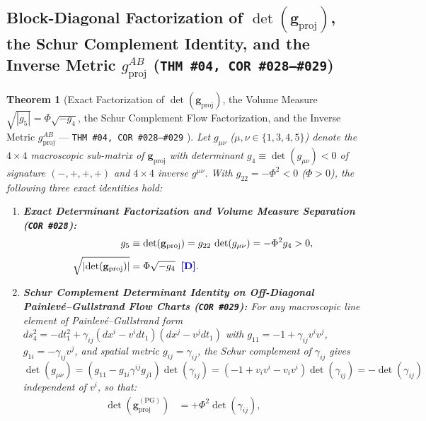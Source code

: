 \documentclass[11pt,a4paper]{article}
\newcommand{\catD}{\text{\textbf{\textcolor{blue!75!black}{[D]}}}}
\theoremstyle{definition}
\theoremstyle{plain}
\newtheorem{theorem}[axiom]{Theorem}
\theoremstyle{remark}
\begin{document}
\subsection{\texorpdfstring{Block-Diagonal Factorization of $\det(\mathbf{g}_{\mathrm{proj}})$, the Schur Complement Identity, and the Inverse Metric $g^{AB}_{\mathrm{proj}}$ (\texttt{THM~\#04, COR~\#028--\#029})}{Block-Diagonal Factorization of det(g\_proj), the Schur Complement Identity, and the Inverse Metric g\^AB\_proj}}

\begin{theorem}[Exact Factorization of $\det(\mathbf{g}_{\mathrm{proj}})$, the Volume Measure $\sqrt{|g_5|} = \Phi\sqrt{-g_4}$, the Schur Complement Flow Factorization, and the Inverse Metric $g^{AB}_{\mathrm{proj}}$ --- \texttt{THM~\#04, COR~\#028--\#029} \catD]\label{thm:c1_det_inverse_metric}\label{thm:c1_metric_factorization}
Let $g_{\mu\nu}$ ($\mu,\nu \in \{1,3,4,5\}$) denote the $4\times 4$ macroscopic sub-matrix of $\mathbf{g}_{\mathrm{proj}}$ with determinant $g_4 \equiv \det(g_{\mu\nu}) < 0$ of signature $(-,+,+,+)$ and $4\times 4$ inverse $g^{\mu\nu}$. With $g_{22} = -\Phi^2 < 0$ ($\Phi > 0$), the following three exact identities hold:
\begin{enumerate}[label=(\roman*)]
  \item \textbf{Exact Determinant Factorization and Volume Measure Separation (\texttt{COR~\#028}):}
  \begin{align}
  g_5 &\equiv \det\!\left(\mathbf{g}_{\mathrm{proj}}\right) = g_{22}\,\det\!\left(g_{\mu\nu}\right) = -\Phi^2 g_4 > 0, \nonumber \\[3pt]
  \sqrt{\left|\det\!\left(\mathbf{g}_{\mathrm{proj}}\right)\right|} &= \Phi\sqrt{-g_4} \;\;\catD. \label{eq:c1_det_and_volume}
  \end{align}
  \item \textbf{Schur Complement Determinant Identity on Off-Diagonal Painlev\'e--Gullstrand Flow Charts (\texttt{COR~\#029}):}
  For any macroscopic line element of Painlev\'e--Gullstrand form $ds_4^2 = -dt_1^2 + \gamma_{ij}(dx^i - v^i dt_1)\allowbreak(dx^j - v^j dt_1)$ with $g_{11} = -1 + \gamma_{ij}v^i v^j$, $g_{1i} = -\gamma_{ij}v^j$, and spatial metric $g_{ij} = \gamma_{ij}$, the Schur complement of $\gamma_{ij}$ gives $\det(g_{\mu\nu}) = (g_{11} - g_{1i}\gamma^{ij}g_{j1})\det(\gamma_{ij}) = (-1 + v_i v^i - v_i v^i)\det(\gamma_{ij}) = -\det(\gamma_{ij})$ independent of $v^i$, so that:
  \begin{align}
  \det\!\left(\mathbf{g}_{\mathrm{proj}}^{(\mathrm{PG})}\right) &= +\Phi^2\det(\gamma_{ij}), \qquad

\end{align}
\end{enumerate}
\end{theorem}
\end{document}
